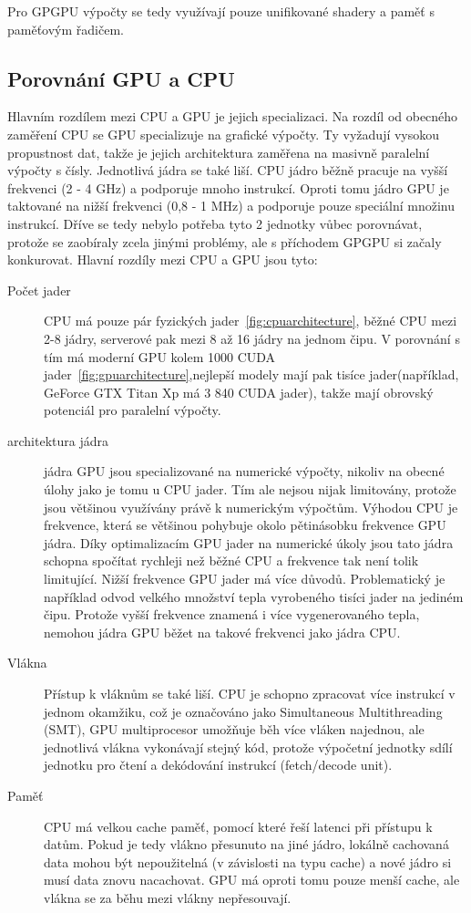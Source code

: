 Pro GPGPU výpočty se tedy využívají pouze unifikované shadery a paměť s paměťovým řadičem.

\subsection{Porovnání GPU a CPU} \label{ssec:gpucpucomparison}
Hlavním rozdílem mezi CPU a GPU je jejich specializaci. Na rozdíl od obecného zaměření CPU se GPU specializuje na grafické výpočty. Ty vyžadují vysokou propustnost dat, takže je jejich architektura zaměřena na masivně paralelní výpočty s čísly. Jednotlivá jádra se také liší. CPU jádro běžně pracuje na vyšší frekvenci (2 - 4 GHz) a podporuje mnoho instrukcí. Oproti tomu jádro GPU je taktované na nižší frekvenci (0,8 - 1 MHz) a podporuje pouze speciální množinu instrukcí. Dříve se tedy nebylo potřeba tyto 2 jednotky vůbec porovnávat, protože se zaobíraly zcela jinými problémy, ale s příchodem GPGPU si začaly konkurovat. Hlavní rozdíly mezi CPU a GPU jsou tyto:
\begin{description}
\item[Počet jader] CPU má pouze pár fyzických jader~\autoref{fig:cpuarchitecture}, běžné CPU mezi 2-8 jádry, serverové pak mezi 8 až 16 jádry na jednom čipu. V porovnání s tím má moderní GPU kolem 1000 CUDA jader~\autoref{fig:gpuarchitecture},nejlepší modely mají pak tisíce jader(například, GeForce GTX Titan Xp má 3 840 CUDA jader), takže mají obrovský potenciál pro paralelní výpočty.
\item[architektura jádra] jádra GPU jsou specializované na numerické výpočty, nikoliv na obecné úlohy jako je tomu u CPU jader. Tím ale nejsou nijak limitovány, protože jsou většinou využívány právě k numerickým výpočtům. Výhodou CPU je frekvence, která se většinou pohybuje okolo pětinásobku frekvence GPU jádra. Díky optimalizacím GPU jader na numerické úkoly jsou tato jádra schopna spočítat rychleji než běžné CPU a frekvence tak není tolik limitující. Nižší frekvence GPU jader má více důvodů. Problematický je například odvod velkého množství tepla vyrobeného tisíci jader na jediném čipu. Protože vyšší frekvence znamená i více vygenerovaného tepla, nemohou jádra GPU běžet na takové frekvenci jako jádra CPU.
\item[Vlákna] Přístup k vláknům se také liší. CPU je schopno zpracovat více instrukcí v jednom okamžiku, což je označováno jako Simultaneous Multithreading (SMT), GPU multiprocesor umožňuje běh více vláken najednou, ale jednotlivá vlákna vykonávají stejný kód, protože výpočetní jednotky sdílí jednotku pro čtení a dekódování instrukcí (fetch/decode unit).
\item[Paměť] CPU má velkou cache paměť, pomocí které řeší latenci při přístupu k datům. Pokud je tedy vlákno přesunuto na jiné jádro, lokálně cachovaná data mohou být nepoužitelná (v závislosti na typu cache) a nové jádro si musí data znovu nacachovat. GPU má oproti tomu pouze menší cache, ale vlákna se za běhu mezi vlákny nepřesouvají.
\end{description}

